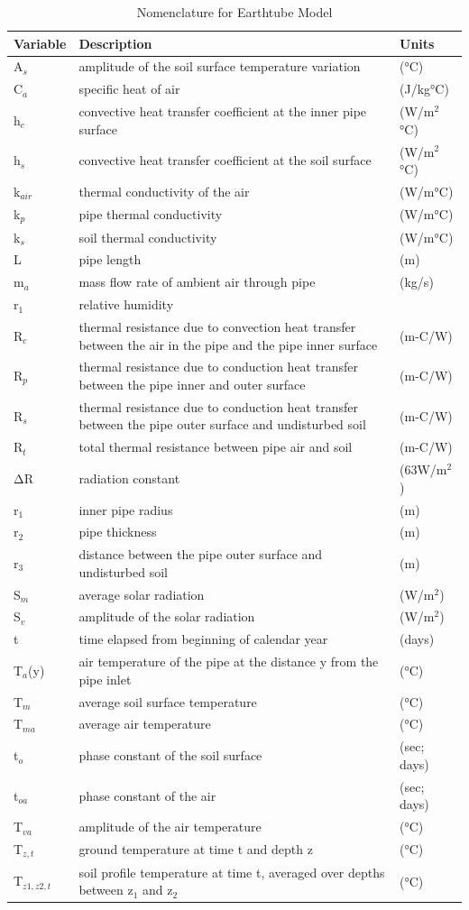 \begin{longtable}[c]{p{1.0in}p{3.5in}p{1.5in}}
\caption{  Nomenclature for Earthtube Model \protect \label{table:nomenclature-for-earthtube-model}}\\
\toprule 
Variable & Description & Units \tabularnewline \midrule
\endhead
A\(_{s}\) & amplitude of the soil surface temperature variation & (°C) \tabularnewline
C\(_{a}\) & specific heat of air & (J/kg°C) \tabularnewline
h\(_{c}\) & convective heat transfer coefficient at the inner pipe surface & (W/m\(^{2}\)°C) \tabularnewline
h\(_{s}\) & convective heat transfer coefficient at the soil surface & (W/m\(^{2}\)°C) \tabularnewline
k\(_{air}\) & thermal conductivity of the air & (W/m°C) \tabularnewline
k\(_{p}\) & pipe thermal conductivity & (W/m°C) \tabularnewline
k\(_{s}\) & soil thermal conductivity & (W/m°C) \tabularnewline
L & pipe length & (m) \tabularnewline
m\(_{a}\) & mass flow rate of ambient air through pipe & (kg/s) \tabularnewline
r\(_{1}\) & relative humidity & ~ \tabularnewline
R\(_{c}\) & thermal resistance due to convection heat transfer between the air in the pipe and the pipe inner surface & (m-C/W) \tabularnewline
R\(_{p}\) & thermal resistance due to conduction heat transfer between the pipe inner and outer surface & (m-C/W) \tabularnewline
R\(_{s}\) & thermal resistance due to conduction heat transfer between the pipe outer surface and undisturbed soil & (m-C/W) \tabularnewline
R\(_{t}\) & total thermal resistance between pipe air and soil & (m-C/W) \tabularnewline
ΔR & radiation constant & (63W/m\(^{2}\)) \tabularnewline
r\(_{1}\) & inner pipe radius & (m) \tabularnewline
r\(_{2}\) & pipe thickness & (m) \tabularnewline
r\(_{3}\) & distance between the pipe outer surface and undisturbed soil & (m) \tabularnewline
S\(_{m}\) & average solar radiation & (W/m\(^{2}\)) \tabularnewline
S\(_{v}\) & amplitude of the solar radiation & (W/m\(^{2}\)) \tabularnewline
t & time elapsed from beginning of calendar year & (days) \tabularnewline
T\(_{a}\)(y) & air temperature of the pipe at the distance y from the pipe inlet & (°C) \tabularnewline
T\(_{m}\) & average soil surface temperature & (°C) \tabularnewline
T\(_{ma}\) & average air temperature & (°C) \tabularnewline
t\(_{o}\) & phase constant of the soil surface & (sec; days) \tabularnewline
t\(_{oa}\) & phase constant of the air & (sec; days) \tabularnewline
T\(_{va}\) & amplitude of the air temperature & (°C) \tabularnewline
T\(_{z,t}\) & ground temperature at time t and depth z & (°C) \tabularnewline
T\(_{z1,z2,t}\) & soil profile temperature at time t, averaged over depths between z\(_{1}\) and z\(_{2}\) & (°C) \tabularnewline

\end{longtable}
